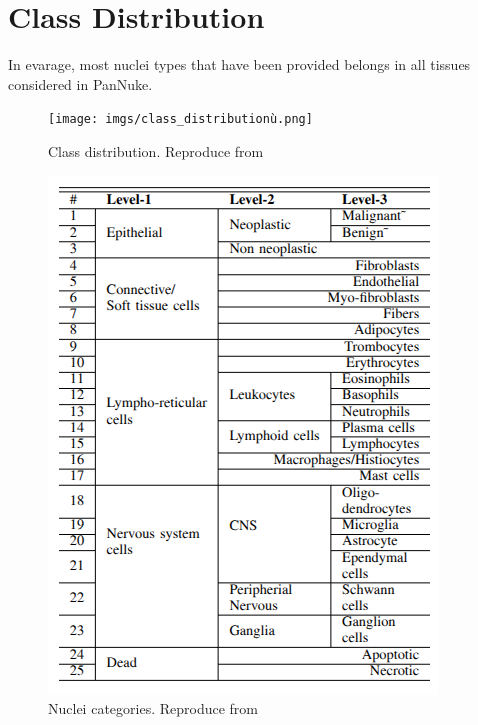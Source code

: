 \documentclass[target=bach,aauheader=,style=]{thud}
\begin{document}
\section{Class Distribution}
\label{sec:classdistribution}
In evarage, most nuclei types that have been provided belongs in all tissues considered in PanNuke.
\begin{figure}[h]
  \centering
  \begin{minipage}{0.45\textwidth}
    \centering
    \texttt{[image: imgs/class\_distributionù.png]}
    \caption{Class distribution. Reproduce from \cite{gamper2020pannuke}}
  \end{minipage}\hspace{2cm}
  \begin{minipage}{0.3\textwidth}
    \centering
    \includegraphics[width=\linewidth]{imgs/class_tab.png}
    \caption{Nuclei categories. Reproduce from \cite{gamper2020pannuke}}
  \end{minipage}
\end{figure}
\end{document}
